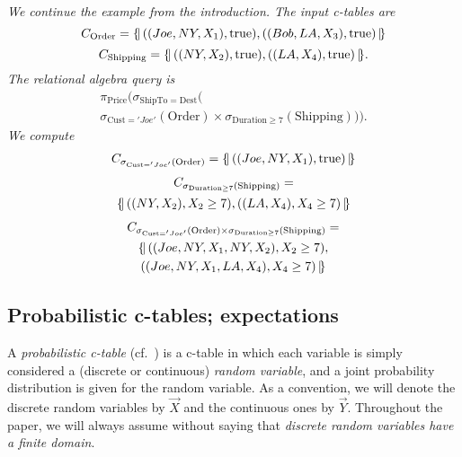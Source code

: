 \begin{example}\em
We continue the example from the introduction. The input c-tables are
\[
C_{\mathrm{Order}} = \{\!|\, ((Joe, NY, X_1), \mbox{true}),
((Bob, LA, X_3), \mbox{true}) \,|\!\}
\]
\[
C_{\mathrm{Shipping}} = \{\!|\, ((NY, X_2), \mbox{true}),
   ((LA, X_4), \mbox{true}) \,|\!\}.
\]
The relational algebra query is
\begin{multline*}
\pi_{\mathrm{Price}}(\sigma_{\mathrm{ShipTo} = \mathrm{Dest}}( \\
\sigma_{\mathrm{Cust}='Joe'}(\mathrm{Order}) \times
\sigma_{\mathrm{Duration} \ge 7}(\mathrm{Shipping}))).
\end{multline*}
%
We compute
\begin{multline*}
C_{\sigma_{\mathrm{Cust}='Joe'}(\mathrm{Order})} = \{\!|\, ((Joe, NY, X_1), \mbox{true})
\,|\!\}
\end{multline*}
\vspace*{-0.35in}
\begin{multline*}
C_{\sigma_{\mathrm{Duration} \ge 7}(\mathrm{Shipping})} =\\
\{\!|\, ((NY, X_2), X_2 \ge 7), ((LA, X_4),X_4 \ge 7) \,|\!\}
\end{multline*}
\vspace*{-0.35in}
\begin{multline*}
C_{\sigma_{\mathrm{Cust}='Joe'}(\mathrm{Order}) \times
\sigma_{\mathrm{Duration} \ge 7}(\mathrm{Shipping})} = \\
\{\!|\, ((Joe, NY, X_1, NY, X_2), X_2 \ge 7),\\
((Joe, NY, X_1, LA, X_4), 
X_4 \ge 7) \,|\!\}
\end{multline*}
\end{example}


\subsection{Probabilistic c-tables; expectations}
\label{sec:montecarlo}


A \textit{probabilistic  c-table} (cf.\ \cite{GT2006, KochMayBMS2008}) is a c-table in  which each variable is
simply considered a (discrete  or continuous) {\em random variable}\/,
and a joint probability distribution is given for the random variable.
As  a convention,  we will  denote  the discrete  random variables  by
$\vec{X}$ and the continuous ones by $\vec{Y}$.  Throughout the paper,
we  will  always  assume  without  saying that  {\em  discrete  random
variables have a finite domain}\/.


